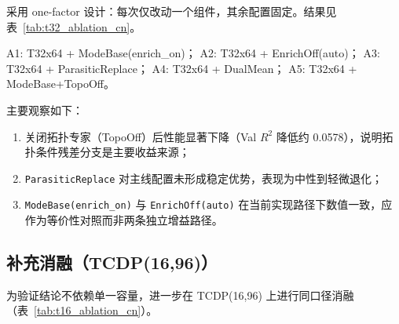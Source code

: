 ﻿\documentclass[12pt,a4paper]{ctexart}
\begin{document}
采用 one-factor 设计：每次仅改动一个组件，其余配置固定。结果见表~\ref{tab:t32_ablation_cn}。

\begin{table}[htbp]
\centering
\scriptsize
\setlength{\tabcolsep}{3.5pt}
\caption{TCDP(32,64) 的 one-factor 消融（每项 5 seeds）。}
\label{tab:t32_ablation_cn}
\vspace{2pt}
\raggedright
\footnotesize
A1: T32x64 + ModeBase(enrich\_on)；
A2: T32x64 + EnrichOff(auto)；
A3: T32x64 + ParasiticReplace；
A4: T32x64 + DualMean；
A5: T32x64 + ModeBase+TopoOff。
\end{table}

主要观察如下：
\begin{enumerate}[leftmargin=1.4em]
  \item 关闭拓扑专家（TopoOff）后性能显著下降（Val $R^2$ 降低约 0.0578），说明拓扑条件残差分支是主要收益来源；
  \item \texttt{ParasiticReplace} 对主线配置未形成稳定优势，表现为中性到轻微退化；
  \item \texttt{ModeBase(enrich\_on)} 与 \texttt{EnrichOff(auto)} 在当前实现路径下数值一致，应作为等价性对照而非两条独立增益路径。
\end{enumerate}

\subsection{补充消融（TCDP(16,96)）}

为验证结论不依赖单一容量，进一步在 TCDP(16,96) 上进行同口径消融（表~\ref{tab:t16_ablation_cn}）。
\end{document}
